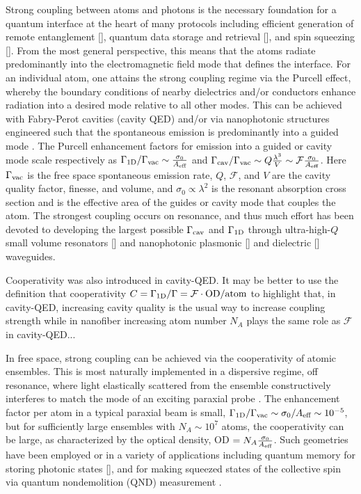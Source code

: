\documentclass[preprint,aps,pra,onecolumn]{revtex4-1} %
\newcommand{\oneD}{{\rm 1D}}
\newcommand{\vac}{{\rm vac}}
\newcommand{\cav}{{\rm cav}}
\newcommand{\comment}[1]{{\color{Maroon} #1}}
\begin{document}
Strong coupling between atoms and photons is the necessary foundation for a quantum interface at the 
heart of many protocols including efficient generation of remote entanglement [], quantum data storage 
and retrieval [], and  spin squeezing []. From the most general perspective, this means that the atoms 
radiate predominantly into the electromagnetic field mode that defines the interface.  For an 
individual atom, one attains the strong coupling regime via the Purcell effect, whereby the boundary 
conditions of nearby dielectrics and/or conductors enhance radiation into a desired mode relative to all 
other modes.  This can be achieved with Fabry-Perot cavities (cavity QED) \cite{} and/or via nanophotonic structures engineered such that the spontaneous emission is predominantly into a guided mode \cite{manga_rao_single_2007,hakuta_manipulating_2012, hung_trapped_2013}.  The Purcell enhancement factors for emission into a guided or cavity mode scale respectively as  $ \Gamma_{\oneD}/\Gamma_{\vac} \sim \frac{\sigma_0}{A_{\eff}}$ and  
$\Gamma_{\cav}/\Gamma_{\vac} \sim   Q \frac{\lambda^3}{V}\sim \mathcal{F}  \frac{\sigma_0}{A_{\eff}}$.  
Here $\Gamma_{\vac}$ is the free space spontaneous emission rate, $Q$, $\mathcal{F}$, and $V$ are the cavity quality factor, finesse, and volume, and $\sigma_0 \propto \lambda^2$ is the resonant absorption cross 
section and is the effective area of the guides or cavity mode that couples the atom.  The strongest 
coupling occurs on resonance, and thus much effort has been devoted to developing the largest possible 
$\Gamma_{\cav}$ and $\Gamma_{\oneD}$ through ultra-high-$Q$ small volume resonators [] and 
nanophotonic plasmonic [] and dielectric [] waveguides.  

\comment{Cooperativity was also introduced in cavity-QED. It may be better to use the definition that cooperativity $C=\Gamma_{\rm 1D}/\Gamma=\mathcal{F}\cdot\mathrm{OD}/\mathrm{atom}$ to highlight that, in cavity-QED, increasing cavity quality is the usual way to increase coupling strength while in nanofiber increasing atom number $ N_A $ plays the same role as $ \mathcal{F} $ in cavity-QED...}

In free space, strong coupling can be achieved via the cooperativity of atomic ensembles. This is most 
naturally implemented in a dispersive regime, off resonance, where light elastically scattered 
from the ensemble constructively interferes to match the mode of an exciting paraxial probe \cite{baragiola_three-dimensional_2014}.  The enhancement factor per atom in a typical paraxial beam is small, $\Gamma_{\oneD}/\Gamma_{\vac} \sim \sigma_0/A_{\eff}  \sim 10^{-5}$, but for sufficiently large ensembles with $N_A \sim  10^7$ atoms, the cooperativity can be large, as characterized by the optical density, OD $= N_A \frac{\sigma_0}{A_{\text{eff}}}$.  Such geometries have been employed or in a variety of applications including quantum memory for storing photonic states [], and for  making squeezed states of the collective spin via quantum nondemolition (QND) measurement \cite{kuzmich_generation_2000}.   
\end{document}
